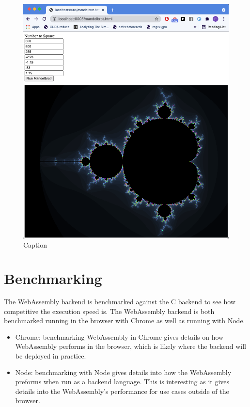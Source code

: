 \documentclass[11pt]{book}
\begin{document}
\begin{figure}[h!]
    \centering
    \includegraphics[scale=0.3]{figures/mandelbrot.png}
    \caption{Caption}
    \label{fig:mandelbrot}
\end{figure}




\section{Benchmarking}

The WebAssembly backend is benchmarked against the C backend to see how competitive the execution speed is. The WebAssembly backend is both benchmarked running in the browser with Chrome as well as running with Node. 
\begin{itemize}
    \item Chrome: benchmarking WebAssembly in Chrome gives details on how WebAssembly performs in the browser, which is likely where the backend will be deployed in practice.
    \item Node: benchmarking with Node gives details into how the WebAssembly preforms when run as a backend language. This is interesting as it gives details into the WebAssembly's performance for use cases outside of the browser.
\end{itemize}
\end{document}
